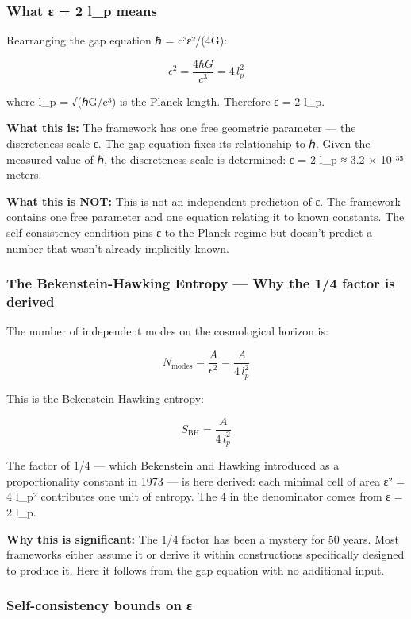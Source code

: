 \documentclass[
]{article}
\begin{document}
\hypertarget{what-ux3b5-2-l_p-means}{%
\subsubsection{What ε = 2 l\_p means}\label{what-ux3b5-2-l_p-means}}

Rearranging the gap equation ℏ = c³ε²/(4G):

\[\epsilon^2 = \frac{4\hbar G}{c^3} = 4 \, l_p^2\]

where l\_p = √(ℏG/c³) is the Planck length. Therefore ε = 2 l\_p.

\textbf{What this is:} The framework has one free geometric parameter
--- the discreteness scale ε. The gap equation fixes its relationship to
ℏ. Given the measured value of ℏ, the discreteness scale is determined:
ε = 2 l\_p ≈ 3.2 × 10⁻³⁵ meters.

\textbf{What this is NOT:} This is not an independent prediction of ε.
The framework contains one free parameter and one equation relating it
to known constants. The self-consistency condition pins ε to the Planck
regime but doesn't predict a number that wasn't already implicitly
known.

\hypertarget{the-bekenstein-hawking-entropy-why-the-14-factor-is-derived}{%
\subsubsection{The Bekenstein-Hawking Entropy --- Why the 1/4 factor is
derived}\label{the-bekenstein-hawking-entropy-why-the-14-factor-is-derived}}

The number of independent modes on the cosmological horizon is:

\[N_{\text{modes}} = \frac{A}{\epsilon^2} = \frac{A}{4 \, l_p^2}\]

This is the Bekenstein-Hawking entropy:

\[S_{\text{BH}} = \frac{A}{4 \, l_p^2}\]

The factor of 1/4 --- which Bekenstein and Hawking introduced as a
proportionality constant in 1973 --- is here derived: each minimal cell
of area ε² = 4 l\_p² contributes one unit of entropy. The 4 in the
denominator comes from ε = 2 l\_p.

\textbf{Why this is significant:} The 1/4 factor has been a mystery for
50 years. Most frameworks either assume it or derive it within
constructions specifically designed to produce it. Here it follows from
the gap equation with no additional input.

\hypertarget{self-consistency-bounds-on-ux3b5}{%
\subsubsection{Self-consistency bounds on
ε}\label{self-consistency-bounds-on-ux3b5}}
\end{document}
